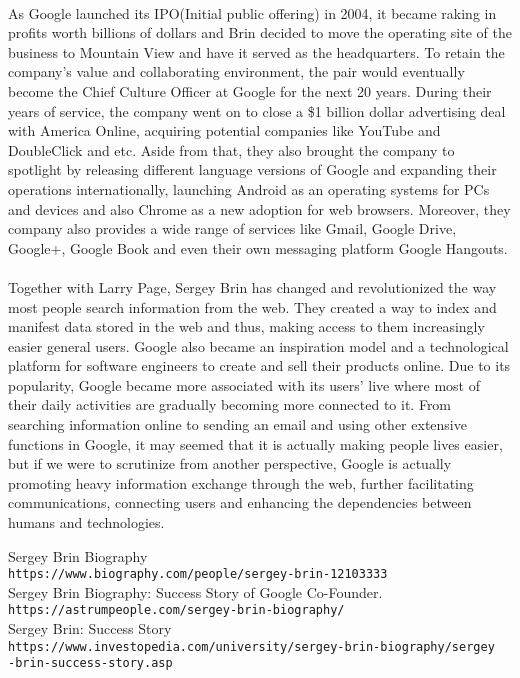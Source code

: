 \documentclass[12pt]{article}
\begin{document}
\paragraph{}
As Google launched its IPO(Initial public offering) in 2004, it became raking in profits worth billions of dollars and Brin decided to move the operating site of the business to Mountain View and have it served as the headquarters. To retain the company's value and collaborating environment, the pair would eventually become the Chief Culture Officer at Google for the next 20 years. During their years of service, the company went on to close a \$1 billion dollar advertising deal with America Online, acquiring potential companies like YouTube and DoubleClick and etc. Aside from that, they also brought the company to spotlight by releasing different language versions of Google and expanding their operations internationally, launching Android as an operating systems for PCs and devices and also Chrome as a new adoption for web browsers. Moreover, they company also provides a wide range of services like Gmail, Google Drive, Google+, Google Book and even their own messaging platform Google Hangouts.

\paragraph{}
Together with Larry Page, Sergey Brin has changed and revolutionized the way most people search information from the web. They created a way to index and manifest data stored in the web and thus, making access to them increasingly easier general users. Google also became an inspiration model and a technological platform for software engineers to create and sell their products online. Due to its popularity, Google became more associated with its users' live where most of their daily activities are gradually becoming more connected to it. From searching information online to sending an email and using other extensive functions in Google, it may seemed that it is actually making people lives easier, but if we were to scrutinize from another perspective, Google is actually promoting heavy information exchange through the web, further facilitating communications, connecting users and enhancing the dependencies between humans and technologies.
\bigskip\noindent

\medskip
 
\begin{thebibliography}{9}

Sergey Brin Biography
\\\texttt{https://www.biography.com/people/sergey-brin-12103333}
\\
Sergey Brin Biography: Success Story of Google Co-Founder.
\\\texttt{https://astrumpeople.com/sergey-brin-biography/}
\\
Sergey Brin: Success Story
\\\texttt{https://www.investopedia.com/university/sergey-brin-biography/sergey\\-brin-success-story.asp}
\end{thebibliography}
 
\end{document}
